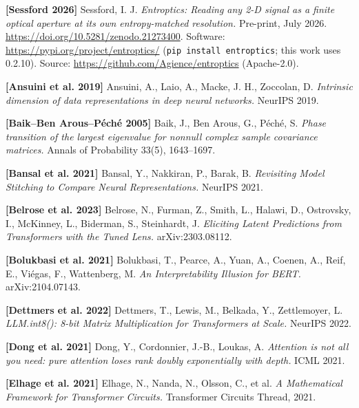 \documentclass[10pt,letterpaper,twocolumn]{article}
\begin{document}
\textbf{{[}Sessford 2026{]}} Sessford, I. J. \emph{Entroptics: Reading any 2-D signal as a finite optical aperture at its own entropy-matched resolution.} Pre-print, July 2026. \href{https://doi.org/10.5281/zenodo.21273400}{https:\allowbreak{}/\allowbreak{}/\allowbreak{}doi.\allowbreak{}org/\allowbreak{}10.\allowbreak{}5281/\allowbreak{}zenodo.\allowbreak{}21273400}. Software: \href{https://pypi.org/project/entroptics/}{https:\allowbreak{}/\allowbreak{}/\allowbreak{}pypi.\allowbreak{}org/\allowbreak{}project/\allowbreak{}entropti\allowbreak{}cs/} (\texttt{pip\ install\ entroptics}; this work uses 0.2.10). Source: \href{https://github.com/Agience/entroptics}{https:\allowbreak{}/\allowbreak{}/\allowbreak{}github.\allowbreak{}com/\allowbreak{}Agience/\allowbreak{}entropti\allowbreak{}cs} (Apache-2.0).

\textbf{{[}Ansuini et al. 2019{]}} Ansuini, A., Laio, A., Macke, J. H., Zoccolan, D. \emph{Intrinsic dimension of data representations in deep neural networks.} NeurIPS 2019.

\textbf{{[}Baik--Ben Arous--Péché 2005{]}} Baik, J., Ben Arous, G., Péché, S. \emph{Phase transition of the largest eigenvalue for nonnull complex sample covariance matrices.} Annals of Probability 33(5), 1643--1697.

\textbf{{[}Bansal et al. 2021{]}} Bansal, Y., Nakkiran, P., Barak, B. \emph{Revisiting Model Stitching to Compare Neural Representations.} NeurIPS 2021.

\textbf{{[}Belrose et al. 2023{]}} Belrose, N., Furman, Z., Smith, L., Halawi, D., Ostrovsky, I., McKinney, L., Biderman, S., Steinhardt, J. \emph{Eliciting Latent Predictions from Transformers with the Tuned Lens.} arXiv:2303.08112.

\textbf{{[}Bolukbasi et al. 2021{]}} Bolukbasi, T., Pearce, A., Yuan, A., Coenen, A., Reif, E., Viégas, F., Wattenberg, M. \emph{An Interpretability Illusion for BERT.} arXiv:2104.07143.

\textbf{{[}Dettmers et al. 2022{]}} Dettmers, T., Lewis, M., Belkada, Y., Zettlemoyer, L. \emph{LLM.int8(): 8-bit Matrix Multiplication for Transformers at Scale.} NeurIPS 2022.

\textbf{{[}Dong et al. 2021{]}} Dong, Y., Cordonnier, J.-B., Loukas, A. \emph{Attention is not all you need: pure attention loses rank doubly exponentially with depth.} ICML 2021.

\textbf{{[}Elhage et al. 2021{]}} Elhage, N., Nanda, N., Olsson, C., et al. \emph{A Mathematical Framework for Transformer Circuits.} Transformer Circuits Thread, 2021.
\end{document}
